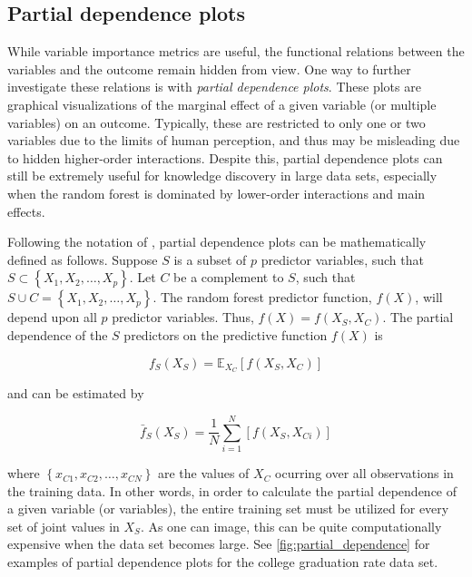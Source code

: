 
\subsection{Partial dependence plots}


	While variable importance metrics are useful, the functional relations between the variables and the outcome remain hidden from view. One way to further investigate these relations is with \textit{partial dependence plots}. These plots are graphical visualizations of the marginal effect of a given variable (or multiple variables) on an outcome. Typically, these are restricted to only one or two variables due to the limits of human perception, and thus may be misleading due to hidden higher-order interactions. Despite this, partial dependence plots can still be extremely useful for knowledge discovery in large data sets, especially when the random forest is dominated by lower-order interactions and main effects. 


	Following the notation of , partial dependence plots can be mathematically defined as follows. Suppose $S$ is a subset of $p$ predictor variables, such that $S \subset \left\{X_1, X_2, \ldots, X_p\right\}$. Let $C$ be a complement to $S$, such that $S \cup C = \left\{X_1, X_2, \ldots, X_p\right\}$. The random forest predictor function, $f(X)$, will depend upon all $p$ predictor variables. Thus, $f(X) = f(X_S, X_C)$. The partial dependence of the $S$ predictors on the predictive function $f(X)$ is


\begin{equation}
f_S(X_S) = \mathbb{E}_{X_C}[f(X_S, X_C)]
\end{equation}


\noindent and can be estimated by


\begin{equation}
\bar{f}_S(X_S) = \frac{1}{N}\sum_{i = 1}^{N}[f(X_S, X_{Ci})]
\end{equation}


\noindent where $\left\{x_{C1}, x_{C2}, \ldots, x_{CN}\right\}$ are the values of $X_C$ ocurring over all observations in the training data. In other words, in order to calculate the partial dependence of a given variable (or variables), the entire training set must be utilized for every set of joint values in $X_S$. As one can image, this can be quite computationally expensive when the data set becomes large. See \autoref{fig:partial_dependence} for examples of partial dependence plots for the college graduation rate data set. 

